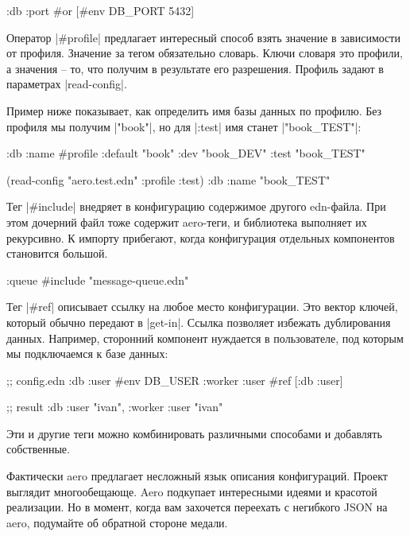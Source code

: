 \begin{code}
{:db {:port #or [#env DB_PORT 5432]}}
\end{code}

Оператор \spverb|#profile| предлагает интересный способ взять значение в зависимости от
профиля. Значение за тегом обязательно словарь. Ключи словаря это профили, а
значения -- то, что получим в результате его разрешения. Профиль задают в
параметрах \spverb|read-config|.

Пример ниже показывает, как определить имя базы данных по профилю. Без профиля
мы получим \spverb|"book"|, но для \spverb|:test| имя станет \spverb|"book_TEST"|:

\begin{code}
{:db {:name #profile {:default "book"
                      :dev     "book_DEV"
                      :test    "book_TEST"}}}

(read-config "aero.test.edn" {:profile :test})
{:db {:name "book_TEST"}}
\end{code}

Тег \spverb|#include| внедряет в конфигурацию содержимое другого edn-файла. При этом
дочерний файл тоже содержит aero-теги, и библиотека выполняет их рекурсивно. К
импорту прибегают, когда конфигурация отдельных компонентов становится большой.

\begin{code}
{:queue #include "message-queue.edn"}
\end{code}

Тег \spverb|#ref| описывает ссылку на любое место конфигурации. Это вектор ключей,
который обычно передают в \spverb|get-in|. Ссылка позволяет избежать дублирования
данных. Например, сторонний компонент нуждается в пользователе, под которым мы
подключаемся к базе данных:

\begin{code}
;; config.edn
{:db {:user #env DB_USER}
 :worker {:user #ref [:db :user]}}

;; result
{:db {:user "ivan"}, :worker {:user "ivan"}}
\end{code}

Эти и другие теги можно комбинировать различными способами и добавлять
собственные.

Фактически aero предлагает несложный язык описания конфигураций. Проект выглядит
многообещающе. Aero подкупает интересными идеями и красотой реализации. Но в
момент, когда вам захочется переехать с негибкого JSON на aero, подумайте об
обратной стороне медали.

